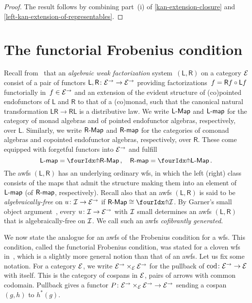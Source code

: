 \documentclass[reqno,10pt,a4paper,oneside,draft]{amsart}
\newcommand{\LL}{\mathsf{L}}
\newcommand{\RR}{\mathsf{R}}
\begin{document}
{{\begin{proof}
The result follows by combining part~(i) of \cref{kan-extension-closure} and \cref{left-kan-extension-of-representables}.
\end{proof}

\section{The functorial Frobenius condition}
\label{sec:frobc}

Recall from~\cite{garner:small-object-argument,grandis-tholen-nwfs} that an \emph{algebraic weak factorization} system~$(\LL, \RR)$ on a category $\cal{E}$ consist of a pair of functors $\LL, \RR \co \cal{E}^\to \to \cal{E}^\to$ providing factorizations~$f = \RR f \cc \LL f$ functorially in~$f \in \cal{E}^\to$ and an extension of the evident structure of (co)pointed endofunctors of $\LL$ and $\RR$ to that of a (co)monad, such that the canonical natural transformation $\LL \RR \to \RR \LL$ is a distributive law.
We write $\pCoalg{\LL}$ and $\pcoalg{\LL}$ for the category of monad algebras and of pointed endofunctor algebras, respectively, over $\LL$. Similarly, we write $\pAlg{\RR}$ and $\palg{\RR}$  for the categories of comonad algebras and copointed endofunctor algebras, respectively, over $\RR$. These come equipped with forgetful functors into $\cal{E}^\to$ and fulfill
\[
\pcoalg{\LL} = \liftl{\pAlg{\RR}}
\, , \quad
\palg{\RR} = \liftr{\pCoalg{\LL}}
\, .\]
The awfs $(\LL, \RR)$ has an underlying ordinary wfs, in which the left (right) class consists of the maps that admit the structure making them into an element of $\pcoalg{\LL}$ (of $\palg{\RR}$, respectively).
Recall also that an awfs
$(\LL, \RR)$ is said to be \emph{algebraically-free} on $u \co \cal{I} \to \cal{E}^\to$ if $\pAlg{\RR} \iso \liftr{\cal{I}}$.
By Garner's small object argument~\cite{garner:small-object-argument}, every $u \co \cal{I} \to \cal{E}^\to$ with $\cal{I}$ small determines an awfs $(\LL, \RR)$ that is algebraically-free on $\cal{I}$.
We call such an awfs \emph{cofibrantly generated}.

We now state the analogue for an awfs of the Frobenius condition for a wfs.
This condition, called the functorial Frobenius condition, was stated for a cloven wfs in~\cite{garner:topological-simplicial}, which is a slightly more general notion than
that of an awfs.
Let us fix some notation.
For a category $\cal{E}$, we write $\cal{E}^\to \times_\cal{E} \cal{E}^\to$ for the pullback of $\cod \co \cal{E}^\to \to \cal{E}$ with itself.
This is the category of cospans in $\cal{E}$, \ie pairs of arrows with common codomain.
Pullback gives a functor $P \co  \cal{E}^\to \times_{\cal{E}} \cal{E}^\to \to \cal{E}^\to$ sending a cospan $(g, h)$ to $h^*(g)$.

}}
\end{document}
